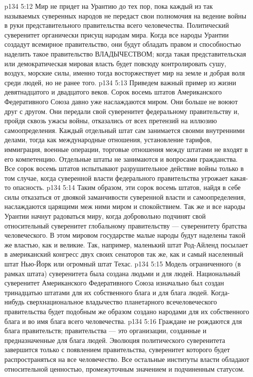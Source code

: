 \vs p134 5:12 \pc Мир не придет на Урантию до тех пор, пока каждый из так называемых суверенных народов не передаст свои полномочия на ведение войны в руки представительного правительства всего человечества. Политический суверенитет органически присущ народам мира. Когда все народы Урантии создадут всемирное правительство, они будут обладать правом и способностью наделить такое правительство ВЛАДЫЧЕСТВОМ; когда такая представительская или демократическая мировая власть будет повсюду контролировать сушу, воздух, морские силы, именно тогда восторжествует мир на земле и добрая воля среди людей, но не ранее того.
\vs p134 5:13 Приведем важный пример из жизни девятнадцатого и двадцатого веков. Сорок восемь штатов Американского Федеративного Союза давно уже наслаждаются миром. Они больше не воюют друг с другом. Они передали свой суверенитет федеральному правительству и, пройдя сквозь ужасы войны, отказались от всех претензий на иллюзию самоопределения. Каждый отдельный штат сам занимается своими внутренними делами, тогда как международные отношения, установление тарифов, иммиграция, военные операции, торговые отношения между штатами не входят в его компетенцию. Отдельные штаты не занимаются и вопросами гражданства. Все сорок восемь штатов испытывают разрушительное действие войны только в том случае, когда суверенной власти федерального правительства угрожает какая\hyp{}то опасность.
\vs p134 5:14 \pc Таким образом, эти сорок восемь штатов, найдя в себе силы отказаться от двоякой заманчивости суверенной власти и самоопределения, наслаждаются царящими меж ними миром и спокойствием. Так же и все народы Урантии начнут радоваться миру, когда добровольно подчинят свой относительный суверенитет глобальному правительству --- суверенитету братства человеческого. В этом мировом государстве малые народы будут наделены такой же властью, как и великие. Так, например, маленький штат Род\hyp{}Айленд посылает в американский конгресс двух своих сенаторов так же, как и самый населенный штат Нью\hyp{}Йорк или огромный штат Техас.
\vs p134 5:15 Модель ограниченного (в рамках штата) суверенитета была создана людьми и для людей. Национальный суверенитет Американского Федеративного Союза изначально был создан тринадцатью штатами для их собственного блага и для блага людей. Когда\hyp{}нибудь сверхнациональное владычество планетарного всечеловеческого правительства будет подобным же образом создано народами для их собственного блага и во имя блага всего человечества.
\vs p134 5:16 Граждане не рождаются для блага правительств; правительства --- это организации, созданные и предназначенные для блага людей. Эволюция политического суверенитета завершится только с появлением правительства, суверенитет которого будет распространяться на все человечество. Все остальные институты власти обладают относительной ценностью, промежуточным значением и подчиненным статусом.
